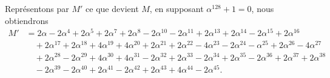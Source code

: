 \documentclass[11pt,a4paper]{book}
\begin{document}
Repr\'{e}sentons par $M'$ ce que devient $M$, en supposant $\alpha^{128} + 1 = 0$, nous obtiendrons
\begin{align*}
M' &= 2\alpha - 2\alpha^4 + 2\alpha^5 + 2\alpha^7 + 2\alpha^8 - 2\alpha^{10} - 2\alpha^{11} + 2\alpha^{13} + 2\alpha^{14} - 2\alpha^{15} + 2\alpha^{16} \\
&\quad + 2\alpha^{17} + 2\alpha^{18} + 4\alpha^{19} + 4\alpha^{20} + 2\alpha^{21} + 2\alpha^{22} - 4\alpha^{23} - 2\alpha^{24} - \alpha^{25} + 2\alpha^{26} - 4\alpha^{27} \\
&\quad + 2\alpha^{28} - 2\alpha^{29} + 4\alpha^{30} + 4\alpha^{31} - 2\alpha^{32} + 2\alpha^{33} - 2\alpha^{34} + 2\alpha^{35} - 2\alpha^{36} + 2\alpha^{37} + 2\alpha^{38} \\
&\quad - 2\alpha^{39} - 2\alpha^{40} + 2\alpha^{41} - 2\alpha^{42} + 2\alpha^{43} + 4\alpha^{44} - 2\alpha^{45}.
\end{align*}
\end{document}
